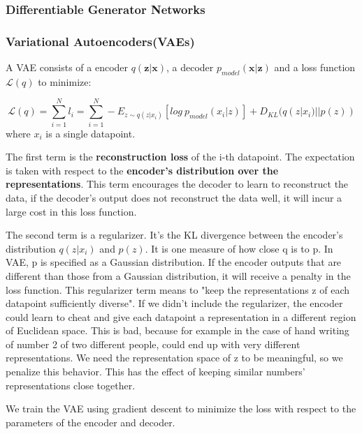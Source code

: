 \documentclass[12pt]{article}
\numberwithin{equation}{section}
\begin{document}
\subsubsection{Differentiable Generator Networks}
\subsubsection{Variational Autoencoders(VAEs)}
	A VAE consists of a encoder $q(\bm{z}|\bm{x})$, a decoder $p_{model}(\bm{x}|\bm{z})$ and a loss function $\mathcal{L}(q)$ to minimize: \par
	\begin{equation}
		\mathcal{L}(q) = \sum^N_{i=1} l_i=\sum^N_{i=1}-E_{z \sim q(z|x_i)}[log \ p_{model}(x_i|z)] + D_{KL}(q(z|x_i)||p(z))
	\end{equation}
where $x_i$ is a single datapoint. \par
	The first term is the \textbf{reconstruction loss} of the i-th datapoint. The expectation is taken with respect to the \textbf{encoder's distribution over the representations}. This term encourages the decoder to learn to reconstruct the data, if the decoder's output does not reconstruct the data well, it will incur a large cost in this loss function. \par
	The second term is a regularizer. It's the KL divergence between the encoder's distribution $q(z|x_i)$ and $p(z)$. It is one measure of how close q is to p. In VAE, p is specified as a Gaussian distribution. If the encoder outputs that are different than those from a Gaussian distribution, it will receive a penalty in the loss function. This regularizer term means to "keep the representations z of each datapoint sufficiently diverse". If we didn't include the regularizer, the encoder could learn to cheat and give each datapoint a representation in a different region of Euclidean space. This is bad, because for example in the case of hand writing of number 2 of two different people, could end up with very different representations. We need the representation space of z to be meaningful, so we penalize this behavior. This has the effect of keeping similar numbers' representations close together. \par
	We train the VAE using gradient descent to minimize the loss with respect to the parameters of the encoder and decoder. \par
\end{document}
